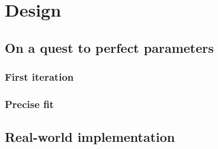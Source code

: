 \chapter{Design}

\section{On a quest to perfect parameters}

\subsection{First iteration}

\subsection{Precise fit}

\section{Real-world implementation}